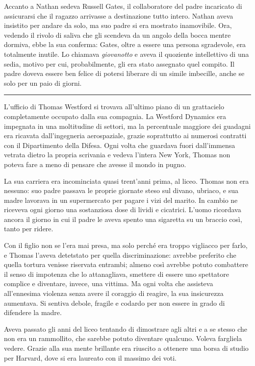 \documentclass[a4paper,oneside,10pt]{memoir}
\begin{document}
Accanto a Nathan sedeva Russell Gates, il collaboratore del padre incaricato di assicurarsi che il ragazzo arrivasse a
destinazione tutto intero. Nathan aveva insistito per andare da solo, ma suo padre si era mostrato inamovibile. Ora,
vedendo il rivolo di saliva che gli scendeva da un angolo della bocca mentre dormiva, ebbe la sua conferma: Gates, oltre
a essere una persona sgradevole, era totalmente inutile. Lo chiamava \emph{giovanotto} e aveva il quoziente intellettivo
di una sedia, motivo per cui, probabilmente, gli era stato assegnato quel compito. Il padre doveva essere ben felice di
potersi liberare di un simile imbecille, anche se solo per un paio di giorni.

\plainbreak{1}

L'ufficio di Thomas Westford si trovava all'ultimo piano di un grattacielo completamente occupato dalla sua compagnia.
La Westford Dynamics era impegnata in una moltitudine di settori, ma la percentuale maggiore dei guadagni era ricavata
dall'ingegneria aerospaziale, grazie soprattutto ai numerosi contratti con il Dipartimento della Difesa. Ogni volta che
guardava fuori dall'immensa vetrata dietro la propria scrivania e vedeva l'intera New York, Thomas non poteva fare a
meno di pensare che avesse il mondo in pugno.

La sua carriera era incominciata quasi trent'anni prima, al liceo. Thomas non era nessuno: suo padre passava le proprie
giornate steso sul divano, ubriaco, e sua madre lavorava in un supermercato per pagare i vizi del marito. In cambio ne
riceveva ogni giorno una sostanziosa dose di lividi e cicatrici. L'uomo ricordava ancora il giorno in cui il padre le
aveva spento una sigaretta su un braccio così, tanto per ridere.

Con il figlio non se l'era mai presa, ma solo perché era troppo vigliacco per farlo, e Thomas l'aveva detetstato per
quella discriminazione: avrebbe preferito che quella tortura venisse riservata entrambi; almeno così avrebbe potuto
combattere il senso di impotenza che lo attanagliava, smettere di essere uno spettatore complice e diventare, invece,
una vittima. Ma ogni volta che assisteva all'ennesima violenza senza avere il coraggio di reagire, la sua insicurezza
aumentava. Si sentiva debole, fragile e codardo per non essere in grado di difendere la madre.

Aveva passato gli anni del liceo tentando di dimostrare agli altri e a se stesso che non era un rammollito, che sarebbe
potuto diventare qualcuno. Voleva fargliela vedere. Grazie alla sua mente brillante era riuscito a ottenere una borsa di
studio per Harvard, dove si era laureato con il massimo dei voti.
\end{document}
